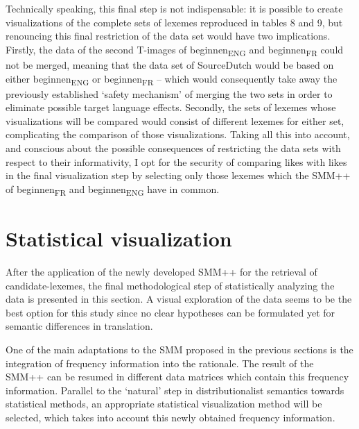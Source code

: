 Technically speaking, this final step is not indispensable: it is possible to create visualizations of the complete sets of lexemes reproduced in tables 8 and 9, but renouncing this final restriction of the data set would have two implications. Firstly, the data of the second T-images of beginnen\textsubscript{ENG} and beginnen\textsubscript{FR} could not be merged, meaning that the data set of SourceDutch would be based on either beginnen\textsubscript{ENG} or beginnen\textsubscript{FR} – which would consequently take away the previously established ‘safety mechanism’ of merging the two sets in order to eliminate possible target language effects. Secondly, the sets of lexemes whose visualizations will be compared would consist of different lexemes for either set, complicating the comparison of those visualizations. Taking all this into account, and conscious about the possible consequences of restricting the data sets with respect to their informativity, I opt for the security of comparing likes with likes in the final visualization step by selecting only those lexemes which the SMM++ of beginnen\textsubscript{FR} and beginnen\textsubscript{ENG} have in common.


\section{\label{sec:3.7}  Statistical visualization}

After the application of the newly developed SMM++ for the retrieval of candidate-lexemes, the final methodological step of statistically analyzing the data is presented in this section. A visual exploration of the data seems to be the best option for this study since no clear hypotheses can be formulated yet for semantic differences in translation.



One of the main adaptations to the SMM proposed in the previous sections is the integration of frequency information into the rationale. The result of the SMM++ can be resumed in different data matrices which contain this frequency information. Parallel to the ‘natural’ step in distributionalist semantics towards statistical methods, an appropriate statistical visualization method will be selected, which takes into account this newly obtained frequency information.



